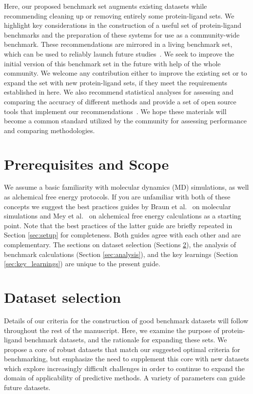 \documentclass[9pt,bestpractices,pubversion]{livecoms}
\begin{document}
Here, our proposed benchmark set augments existing datasets while recommending cleaning up or removing entirely some protein-ligand sets. We highlight key considerations in the construction of a useful set of protein-ligand benchmarks and the preparation of these systems for use as a community-wide benchmark. These recommendations are mirrored in a living benchmark set, which can be used to reliably launch future studies~\cite{dfhahn_openforcefield_2021}. We seek to improve the initial version of this benchmark set in the future with help of the whole community. We welcome any contribution either to improve the existing set or to expand the set with new protein-ligand sets, if they meet the requirements established in here. 
%
We also recommend statistical analyses for assessing and comparing the accuracy of different methods and provide a set of open source tools that implement our recommendations~\cite{github_openforcefield_arsenic_2020}. 
%
We hope these materials will become a common standard utilized by the community for assessing performance and comparing methodologies.  


\section{Prerequisites and Scope}
We assume a basic familiarity with molecular dynamics (MD) simulations, as well as alchemical free energy protocols. 
If you are unfamiliar with both of these concepts we suggest the best practices guides by Braun et al.~\cite{braunBestPracticesFoundations2019} on molecular simulations and Mey et al.~\cite{meyBestPracticesAlchemical2020} on alchemical free energy calculations as a starting point. Note that the best practices of the latter guide are briefly repeated in Section \ref{sec:setup} for completeness. Both guides agree with each other and are complementary. The sections on dataset selection (Sections \ref{sec:dataset}), the analysis of benchmark calculations (Section \ref{sec:analysis}), and the key learnings (Section \ref{sec:key_learnings}) are unique to the present guide. 


\section{Dataset selection}
\label{sec:dataset}

Details of our criteria for the construction of good benchmark datasets will follow throughout the rest of the manuscript. 
Here, we examine the purpose of protein-ligand benchmark datasets, and the rationale for expanding these sets.
We propose a core of robust datasets that match our suggested optimal criteria for benchmarking, but emphasize the need to supplement this core with new datasets which explore increasingly difficult challenges in order to continue to expand the domain of applicability of predictive methods. 
A variety of parameters can guide future datasets.
\end{document}
